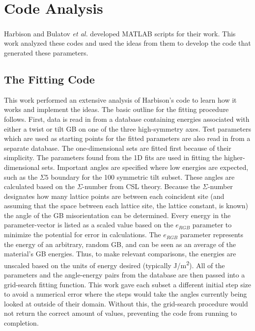 \documentclass[twoside,senior]{BYUPhys}
\begin{document}
\section{Code Analysis\label{methods:code}}
Harbison\cite{harbison2015} and Bulatov \emph{et al.}\cite{bulatov2014} developed MATLAB\textsuperscript{\textregistered} scripts for their work.  This work analyzed these codes and used the ideas from them to develop the code that generated these parameters.

\subsection{The Fitting Code\label{code:fitting}}
This work performed an extensive analysis of Harbison's\cite{harbison2015} code to learn how it works and implement the ideas.  The basic outline for the fitting procedure follows.  First, data is read in from a database containing energies associated with either a twist or tilt GB on one of the three high-symmetry axes.  Test parameters which are used as starting points for the fitted parameters are also read in from a separate database.  The one-dimensional sets are fitted first because of their simplicity.  The parameters found from the 1D fits are used in fitting the higher-dimensional sets.  Important angles are specified where low energies are expected, such as the $\Sigma5$ boundary for the \textlangle{}100\textrangle{} symmetric tilt subset.  These angles are calculated based on the $\Sigma$-number from CSL theory. Because the $\Sigma$-number designates how many lattice points  are between each coincident site (and assuming that the space between each lattice site, the lattice constant, is known) the angle of the GB misorientation can be determined.  Every energy in the parameter-vector is listed as a scaled value based on the $e_{RGB}$ parameter to minimize the potential for error in calculations. The $e_{RGB}$ parameter represents the energy of an arbitrary, random GB, and can be seen as an average of the material's GB energies.  Thus, to make relevant comparisons, the energies are unscaled based on the units of energy desired (typically J/m\textsuperscript{2}).  All of the parameters and the angle-energy pairs from the database are then passed into a grid-search fitting function.  This work gave each subset a different initial step size to avoid a numerical error where the steps would take the angles currently being looked at outside of their domain. Without this, the grid-search procedure would not return the correct amount of values, preventing the code from running to completion.
\end{document}
